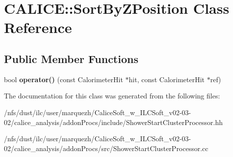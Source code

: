 \section{C\-A\-L\-I\-C\-E\-:\-:Sort\-By\-Z\-Position Class Reference}
\label{classCALICE_1_1SortByZPosition}
\subsection*{Public Member Functions}
\begin{DoxyCompactItemize}
\item 
bool {\bfseries operator()} (const Calorimeter\-Hit $\ast$hit, const Calorimeter\-Hit $\ast$ref)\label{classCALICE_1_1SortByZPosition_af4abe2bd8768d6be11fa7f67e93ea37e}

\end{DoxyCompactItemize}


The documentation for this class was generated from the following files\-:\begin{DoxyCompactItemize}
\item 
/nfs/dust/ilc/user/marquezh/\-Calice\-Soft\-\_\-w\-\_\-\-I\-L\-C\-Soft\-\_\-v02-\/03-\/02/calice\-\_\-analysis/addon\-Procs/include/Shower\-Start\-Cluster\-Processor.\-hh\item 
/nfs/dust/ilc/user/marquezh/\-Calice\-Soft\-\_\-w\-\_\-\-I\-L\-C\-Soft\-\_\-v02-\/03-\/02/calice\-\_\-analysis/addon\-Procs/src/Shower\-Start\-Cluster\-Processor.\-cc\end{DoxyCompactItemize}
